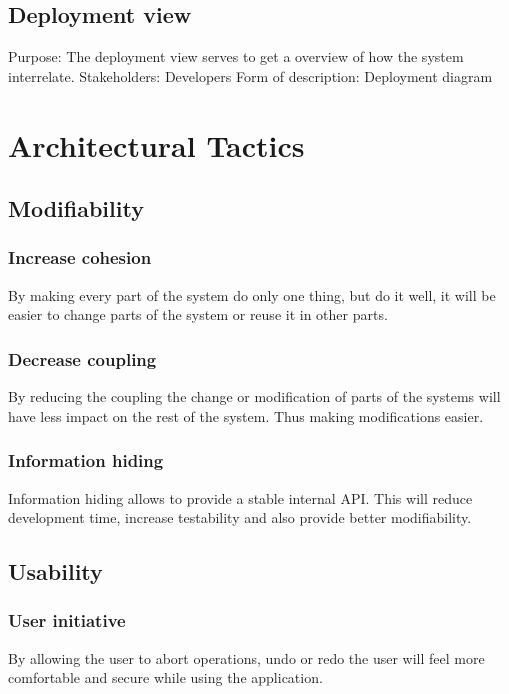 \documentclass[11pt]{book}
\begin{document}
\subsection{Deployment view}\label{subsec:deploymentViewDescription}
Purpose: The deployment view serves to get a overview of how the system interrelate.
Stakeholders: Developers
Form of description: Deployment diagram

\section{Architectural Tactics}

\subsection{Modifiability}

\subsubsection{Increase cohesion}
By making every part of the system do only one thing, but do it well, it will be easier to change parts of the system or reuse it in other parts.

\subsubsection{Decrease coupling}
By reducing the coupling the change or modification of parts of the systems will have less impact on the rest of the system. Thus making modifications easier.

\subsubsection{Information hiding}
Information hiding allows to provide a stable internal API. This will reduce development time, increase testability and also provide better modifiability.

\subsection{Usability}

\subsubsection{User initiative}
By allowing the user to abort operations, undo or redo the user will feel more comfortable and secure while using the application.
\end{document}
